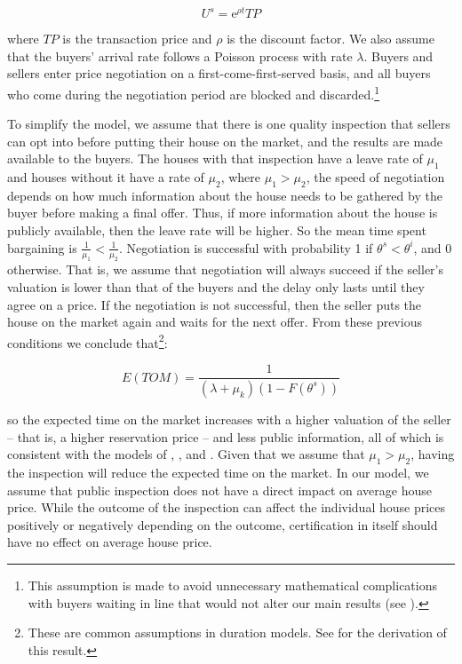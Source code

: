 \documentclass[12pt]{article}
\begin{document}
\begin{equation}
U^s = \mathrm{e}^{\rho t} TP
\end{equation}

\noindent where $TP$ is the transaction price and $\rho$ is the discount factor. We also assume that the buyers' arrival rate follows a Poisson process with rate $\lambda$. Buyers and sellers enter price negotiation on a first-come-first-served basis, and all buyers who come during the negotiation period are blocked and discarded.\footnote{This assumption is made to avoid unnecessary mathematical complications with buyers waiting in line that would not alter our main results (see \citealp{ross2014introduction}).}

To simplify the model, we assume that there is one quality inspection that sellers can opt into before putting their house on the market, and the results are made available to the buyers. The houses with that inspection have a leave rate of $\mu_1$ and houses without it have a rate of $\mu_2$, where $\mu_1 > \mu_2$, the speed of negotiation depends on how much information about the house needs to be gathered by the buyer before making a final offer. Thus, if more information about the house is publicly available, then the leave rate will be higher. So the mean time spent bargaining is $\frac{1}{\mu_1} < \frac{1}{\mu_2}$. Negotiation is successful with probability 1 if $\theta^s < \theta^i$, and 0 otherwise. That is, we assume that negotiation will always succeed if the seller’s valuation is lower than that of the buyers and the delay only lasts until they agree on a price. If the negotiation is not successful, then the seller puts the house on the market again and waits for the next offer. From these previous conditions we conclude that\footnote{These are common assumptions in duration models. See \cite{lancaster1979econometric} for the derivation of this result.}:

\begin{equation}
E(TOM) = \frac{1}{\left( \lambda + \mu_k \right) \left(1 - F(\theta^s) \right)}
\end{equation}
		
\noindent so the expected time on the market increases with a higher valuation of the seller – that is, a higher reservation price – and less public information, all of which is consistent with the models of \cite{taylor1999time}, \cite{kurlat2015testing}, and \cite{han2016role}. Given that we assume that $\mu_1 > \mu_2$, having the inspection will reduce the expected time on the market. In our model, we assume that public inspection does not have a direct impact on average house price. While the outcome of the inspection can affect the individual house prices positively or negatively depending on the outcome, certification in itself should have no effect on average house price.
\end{document}
